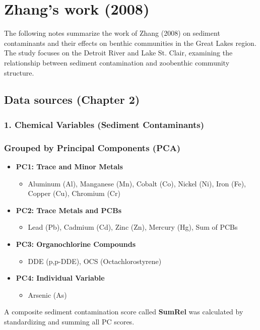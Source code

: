\section{Zhang's work (2008)}
The following notes summarize the work of Zhang (2008) on sediment contaminants and their effects on benthic communities in the Great Lakes region. 
The study focuses on the Detroit River and Lake St. Clair, examining the relationship between sediment contamination and zoobenthic community structure.

\subsection{Data sources (Chapter 2)}
\subsubsection*{1. Chemical Variables (Sediment Contaminants)}
\subsubsection*{Grouped by Principal Components (PCA)}
\begin{itemize}
    \item \textbf{PC1: Trace and Minor Metals}
    \begin{itemize}
        \item Aluminum (Al), Manganese (Mn), Cobalt (Co), Nickel (Ni), Iron (Fe), Copper (Cu), Chromium (Cr)
    \end{itemize}
    \item \textbf{PC2: Trace Metals and PCBs}
    \begin{itemize}
        \item Lead (Pb), Cadmium (Cd), Zinc (Zn), Mercury (Hg), Sum of PCBs
    \end{itemize}
    \item \textbf{PC3: Organochlorine Compounds}
    \begin{itemize}
        \item DDE (p,p-DDE), OCS (Octachlorostyrene)
    \end{itemize}
    \item \textbf{PC4: Individual Variable}
    \begin{itemize}
        \item Arsenic (As)
    \end{itemize}
\end{itemize}

\vspace{1em}
\noindent A composite sediment contamination score called \textbf{SumRel} was calculated by standardizing and summing all PC scores.

